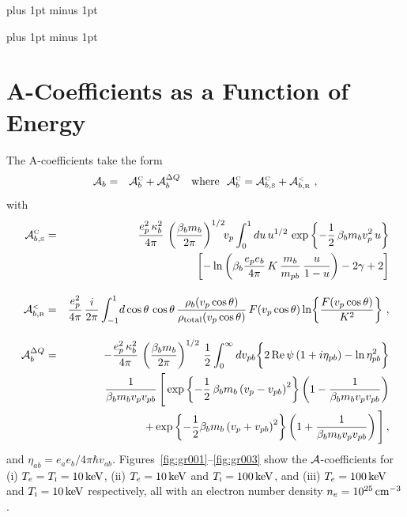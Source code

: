\documentclass[preprint,12pt,eqsecnum,nofootinbib,amsmath,amssymb]{revtex4}
\newcommand{\smC}{{\rm\scriptscriptstyle C}}
\newcommand{\smI}{{\rm\scriptscriptstyle I}}
\newcommand{\smR}{{\rm\scriptscriptstyle R}}
\newcommand{\smS}{{\rm\scriptscriptstyle S}}
\newcommand{\smLT}{{\rm\scriptscriptstyle <}}
\newcommand{\bodyskip}{\baselineskip 18pt plus 1pt minus 1pt}
\newcommand{\tableofcontentsskip}{\baselineskip 14pt plus 1pt minus 1pt}
\begin{document}
\maketitle


\pagebreak
\tableofcontentsskip
\tableofcontents

\newpage
\bodyskip

\pagebreak
\clearpage

\newpage
\section{A-Coefficients as a Function of Energy}

The {\cal A}-coefficients take the form
\begin{eqnarray}
  {\cal A}_b 
  &=&  
  {\cal A}^\smC_b + {\cal A}^{\Delta Q}_b 
  ~~~\text{where}~~
  {\cal A}^\smC_b 
  =
  {\cal A}^\smC_{b,\smS} +  {\cal A}^\smLT_{b,\smR} \ ,
\label{all}
\end{eqnarray}
with
\begin{eqnarray}
  {\cal A}^\smC_{b,\smS}
  &=& 
  \frac{e_p^2\,\kappa^2_b}{4\pi} \,   
  \left( \frac{\beta_b m_b}{2\pi} \right)^{1/2}\!\!
  v_p\int_0^1 du \, u^{1/2} \,\exp\left\{ - \frac{1}{2} \,
  \beta_b m_b v^2_p \, u \right\}
\nonumber\\
  && \qquad
  \left[ -\ln \left(\beta_b  \frac{e_p e_b}{4\pi} \,
  K \, \frac{m_b}{m_{pb}} \, \frac{u}{1-u} \right) 
  - 2 \gamma + 2 \right] 
\label{wonderclassic}
\\[10pt]
  {\cal A}^\smLT_{b,\smR}
  &=&
  \frac{e_p^2}{4 \pi}\, \frac{i}{2 \pi}
  \int_{-1}^1 \! d\cos\theta\, \cos\theta\,
  \frac{\rho_b(v_p\cos\theta)}
  {\rho_{\rm total}(v_p\cos\theta)}\,F(v_p \cos\theta) 
  \ln\!\left\{\frac{F(v_p\cos\theta)}{K^2}\right\} \,, 
\label{nun}
\\[10pt]
  {\cal A}^{\Delta Q}_b
  &=&
  -\frac{e_p^2\, \kappa_b^2}{4 \pi}\,
  \left( \frac{\beta_b m_b}{2\pi} \right)^{1/2}\,
  \frac{1}{2}\int_0^\infty dv_{pb}
  \bigg\{ 2\, {\rm Re} \, \psi \left( 1 + i \eta_{pb}
  \right) - \ln \eta^2_{pb}  \bigg\}
\nonumber\\
  &&
  \frac{1}{\beta_b m_b v_p v_{pb}} \, 
  \Bigg[ \exp\left\{ - \frac{1}{2}\, \beta_b
  m_b \left( v_p - v_{pb} \right)^2\right\} 
   \left( 1 - \frac{1}{\beta_b m_b v_p v_{pb} } \right) 
\nonumber\\
  && \qquad\qquad\quad
  + \exp\left\{ - \frac{1}{2} \beta_b m_b \left( v_p + v_{pb} 
  \right)^2\right\} 
   \left( 1 + \frac{1}{\beta_b m_b v_p v_{pb} } \right) 
\Bigg]	\,,
\label{regb}
\end{eqnarray}
and $\eta_{ab}=e_a e_b/4\pi\hbar v_{ab}$.
Figures~\ref{fig:gr001}--\ref{fig:gr003} show the ${\cal A
}$-coefficients for (i) $T_e = T_\smI=10\,{\rm keV}$, (ii) $T_e =
10\,{\rm keV}$ and $T_\smI=100\,{\rm keV}$, and (iii) $T_e=100\,{\rm
  keV}$ and $T_\smI=10\,{\rm keV}$ respectively, all with an electron
number density $n_e=10^{25}\,{\rm cm^{-3}}$.
\end{document}

